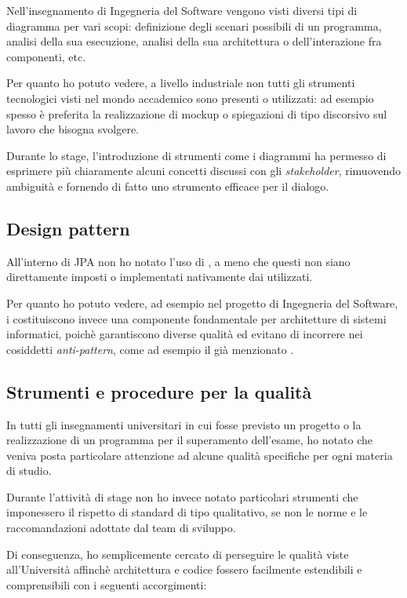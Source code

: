 Nell'insegnamento di Ingegneria del Software vengono visti diversi tipi di
diagramma  per vari scopi: definizione degli scenari possibili di un
programma, analisi della sua esecuzione, analisi della sua architettura o
dell'interazione fra componenti, etc.

Per quanto ho potuto vedere, a livello industriale non tutti gli strumenti
tecnologici visti nel mondo accademico sono presenti o utilizzati: ad esempio
spesso è preferita la realizzazione di mockup o spiegazioni di tipo discorsivo
sul lavoro che bisogna svolgere.

Durante lo stage, l'introduzione di strumenti come i diagrammi  ha
permesso di esprimere più chiaramente alcuni concetti discussi con gli
\emph{stakeholder}, rimuovendo ambiguità e fornendo di fatto uno strumento
efficace per il dialogo.

\subsection{Design pattern}

All'interno di JPA non ho notato l'uso di , a meno che
questi non siano direttamente imposti o implementati nativamente dai
 utilizzati.

Per quanto ho potuto vedere, ad esempio nel progetto di Ingegneria del
Software, i  costituiscono invece una componente
fondamentale per architetture di sistemi informatici, poichè garantiscono
diverse qualità ed evitano di incorrere nei cosiddetti \emph{anti-pattern},
come ad esempio il già menzionato .

\subsection{Strumenti e procedure per la qualità}

In tutti gli insegnamenti universitari in cui fosse previsto un progetto o la
realizzazione di un programma per il superamento dell'esame, ho notato che
veniva posta particolare attenzione ad alcune qualità specifiche per ogni
materia di studio.

Durante l'attività di stage non ho invece notato particolari strumenti che
imponessero il rispetto di standard di tipo qualitativo, se non le norme e le
raccomandazioni adottate dal team di sviluppo.

Di conseguenza, ho semplicemente cercato di perseguire le qualità viste
all'Università affinchè architettura e codice fossero facilmente estendibili e
comprensibili con i seguenti accorgimenti:

